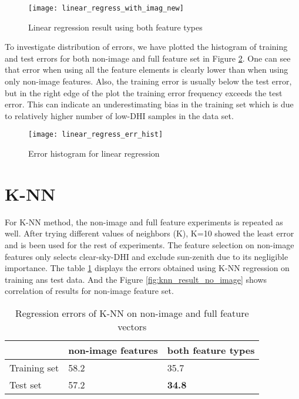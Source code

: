 \begin{figure}[h]
\caption{Linear regression result using both feature types}
\label{fig:ln_result_all}
\texttt{[image: linear\_regress\_with\_imag\_new]}
\centering
\end{figure}

To investigate distribution of errors, we have plotted the histogram of training and test errors for both non-image and full feature set in Figure \ref{fig:ln_result_hist}. One can see that error when using all the feature elements is clearly lower than when using only non-image features. Also, the training error is usually below the test error, but in the right edge of the plot the training error frequency exceeds the test error. This can indicate an underestimating bias in the training set which is due to relatively higher number of low-DHI samples in the data set.

\begin{figure}[h]
\caption{Error histogram for linear regression}
\label{fig:ln_result_hist}
\texttt{[image: linear\_regress\_err\_hist]}
\centering
\end{figure}

\section{K-NN}
For K-NN method, the non-image and full feature experiments is repeated as well. After trying different values of neighbors (K), K=10 showed the least error and is been used for the rest of experiments. The feature selection on non-image features only selects clear-sky-DHI and exclude sun-zenith due to its negligible importance. The table \ref{table:rmse_knn} displays the errors obtained using K-NN regression on training ans test data. And the Figure \ref{fig:knn_result_no_image} shows correlation of results for non-image feature set.

\begin{table}[h!]
\centering
\begin{tabular}{ |p{2.5cm}||p{4cm}|p{4cm}|  }
\hline
 &non-image features& both feature types\\
 \hline
 Training set &   58.2  & 35.7 \\
 Test set&   57.2  & \textbf{34.8} \\
 \hline
\end{tabular}
\caption{Regression errors of K-NN on non-image and full feature vectors}
\label{table:rmse_knn}
\end{table}

